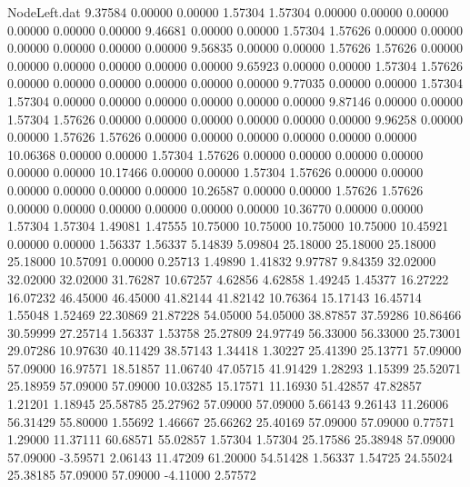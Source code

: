 \begin{filecontents}{NodeLeft.dat}
   9.37584    0.00000    0.00000     1.57304    1.57304    0.00000    0.00000    0.00000    0.00000    0.00000    0.00000
   9.46681    0.00000    0.00000     1.57304    1.57626    0.00000    0.00000    0.00000    0.00000    0.00000    0.00000
   9.56835    0.00000    0.00000     1.57626    1.57626    0.00000    0.00000    0.00000    0.00000    0.00000    0.00000
   9.65923    0.00000    0.00000     1.57304    1.57626    0.00000    0.00000    0.00000    0.00000    0.00000    0.00000
   9.77035    0.00000    0.00000     1.57304    1.57304    0.00000    0.00000    0.00000    0.00000    0.00000    0.00000
   9.87146    0.00000    0.00000     1.57304    1.57626    0.00000    0.00000    0.00000    0.00000    0.00000    0.00000
   9.96258    0.00000    0.00000     1.57626    1.57626    0.00000    0.00000    0.00000    0.00000    0.00000    0.00000
  10.06368    0.00000    0.00000     1.57304    1.57626    0.00000    0.00000    0.00000    0.00000    0.00000    0.00000
  10.17466    0.00000    0.00000     1.57304    1.57626    0.00000    0.00000    0.00000    0.00000    0.00000    0.00000
  10.26587    0.00000    0.00000     1.57626    1.57626    0.00000    0.00000    0.00000    0.00000    0.00000    0.00000
  10.36770    0.00000    0.00000     1.57304    1.57304    1.49081    1.47555   10.75000   10.75000   10.75000   10.75000
  10.45921    0.00000    0.00000     1.56337    1.56337    5.14839    5.09804   25.18000   25.18000   25.18000   25.18000
  10.57091    0.00000    0.25713     1.49890    1.41832    9.97787    9.84359   32.02000   32.02000   32.02000   31.76287
  10.67257    4.62856    4.62858     1.49245    1.45377   16.27222   16.07232   46.45000   46.45000   41.82144   41.82142
  10.76364   15.17143   16.45714     1.55048    1.52469   22.30869   21.87228   54.05000   54.05000   38.87857   37.59286
  10.86466   30.59999   27.25714     1.56337    1.53758   25.27809   24.97749   56.33000   56.33000   25.73001   29.07286
  10.97630   40.11429   38.57143     1.34418    1.30227   25.41390   25.13771   57.09000   57.09000   16.97571   18.51857
  11.06740   47.05715   41.91429     1.28293    1.15399   25.52071   25.18959   57.09000   57.09000   10.03285   15.17571
  11.16930   51.42857   47.82857     1.21201    1.18945   25.58785   25.27962   57.09000   57.09000    5.66143    9.26143
  11.26006   56.31429   55.80000     1.55692    1.46667   25.66262   25.40169   57.09000   57.09000    0.77571    1.29000
  11.37111   60.68571   55.02857     1.57304    1.57304   25.17586   25.38948   57.09000   57.09000   -3.59571    2.06143
  11.47209   61.20000   54.51428     1.56337    1.54725   24.55024   25.38185   57.09000   57.09000   -4.11000    2.57572

\end{filecontents}
